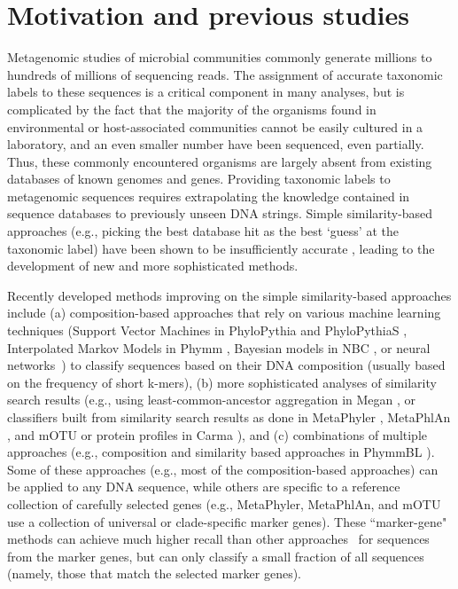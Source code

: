 \section{Motivation and previous studies}\label{tipp:motivation}
Metagenomic studies of microbial communities commonly generate
millions to hundreds of millions of sequencing reads.  The assignment
of accurate taxonomic labels to these sequences is a critical
component in many analyses, but is
complicated by the fact that the majority of the organisms
found in environmental or host-associated communities cannot be easily
cultured in a laboratory, and an even smaller number have been
sequenced, even partially.  Thus, these commonly encountered organisms
are largely absent from existing databases of known genomes and genes.
Providing taxonomic labels to metagenomic sequences requires
extrapolating the knowledge contained in sequence databases to
previously unseen DNA strings.  Simple similarity-based approaches
(e.g., picking the best database hit as the best `guess' at the
taxonomic label) have been shown to be insufficiently
accurate \cite{closest-blast-hit}, leading to the development of 
new and more sophisticated methods.

Recently developed methods improving
on the simple similarity-based approaches include 
(a) composition-based approaches that rely on
various machine learning techniques 
(Support Vector Machines in
PhyloPythia and PhyloPythiaS \cite{McHardy2007a, Patil2011}, 
Interpolated Markov Models in Phymm 
\cite{Brady2011},
Bayesian models in NBC \cite{Rosen2011}, or neural networks~\cite{SOM2006}) to
classify sequences based on their DNA composition (usually based on
the frequency of short k-mers),
(b)  more sophisticated analyses of
similarity search results (e.g., using least-common-ancestor
aggregation in Megan \cite{Huson2007}, or classifiers built from similarity
search results as done in MetaPhyler \cite{Liu2011d,Liu2011}, 
MetaPhlAn \cite{Segata2012a}, and mOTU \cite{Sunagawa2013}
or protein profiles in Carma \cite{Gerlach2011b}), and
(c) combinations of
multiple approaches (e.g., composition and similarity based approaches
in PhymmBL \cite{Brady2009}).  
Some of these approaches (e.g., most of the
composition-based approaches) can be applied to any DNA sequence,
while others are specific to a reference collection of carefully
selected genes (e.g., MetaPhyler, MetaPhlAn, and mOTU use a collection of
universal or clade-specific marker genes).  These
``marker-gene" methods can
achieve much higher recall than other
approaches~\cite{Liu2011d} for sequences from the marker genes, but 
can only classify a small
fraction of all sequences (namely, those that match the 
selected marker genes). 

